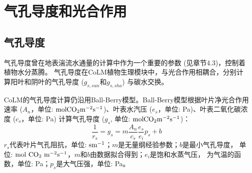 \chapter{气孔导度和光合作用}


\section{气孔导度}\label{气孔导度}
气孔导度曾在地表湍流水通量的计算中作为一个重要的参数 (见章节4.3)，控制着植物水分蒸腾。
气孔导度在CoLM植物生理模块中，与光合作用相耦合，分别计算阳叶和阴叶的气孔导度 ($g_{s,sun}$和$g_{s,sha}$) 与碳水交换。


CoLM的气孔导度计算仍沿用Ball-Berry模型。Ball-Berry模型根据叶片净光合作用速率 
($A_n$，单位: $\rm mol CO_2 m^{-2}s^{-1}$)、叶表水汽压 ($e_s$，单位: Pa)、叶表二氧化碳浓度 ($c_s$，单位: Pa) 
计算气孔导度 ($g_s$, 单位: $\rm mol CO_2 m^{-2}s^{-1}$)： 
\begin{equation}\label{rs_a1}
\frac{1}{r_{s}}=g_{s}=m \frac{A_{n}}{c_{s}} \frac{e_{s}}{e_{i}} p_{s}+b
\end{equation}
$r_s$代表叶片气孔阻抗，单位: $\rm s m^{-1}$；$m$是无量纲经验参数；$b$是最小气孔导度，
单位: $\rm mol\ CO_2\ m^{-2}s^{-1}$，$m$和$b$由数据拟合得到；$e_i$是饱和水蒸气压，
为气温的函数，单位: Pa；$p_s$是大气压强，单位: Pa。
